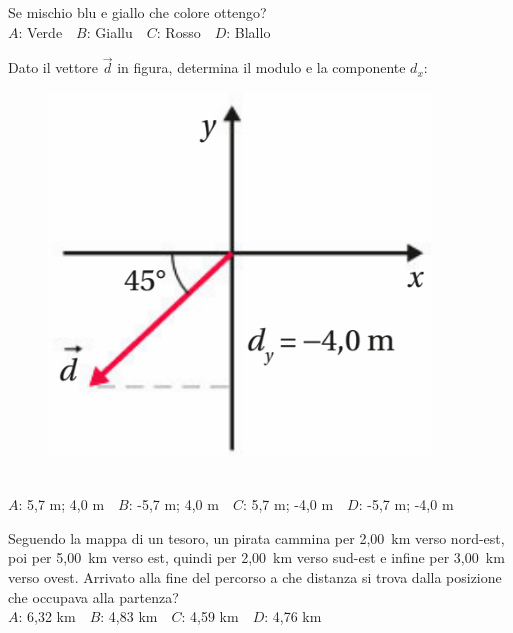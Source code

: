 \def\mcquestionnumber{5}


\mcquestionheader Se mischio blu e giallo che colore ottengo?\\
{$A$}: Verde\ \ {$B$}: Giallu\ \ {$C$}: Rosso\ \ {$D$}: Blallo\ \ 

\mcquestionfooter



\def\mcquestionnumber{6}


\mcquestionheader Dato il vettore $\vec{d}$ in figura, determina il modulo e la componente $d_x$: \begin{figure}[h!]   \begin{center}     \includegraphics[scale=0.35]{vettored.png}   \end{center} \end{figure}\\
{$A$}: 5,7 m; 4,0 m\ \ {$B$}: -5,7 m; 4,0 m\ \ {$C$}: 5,7 m; -4,0 m\ \ {$D$}: -5,7 m; -4,0 m\ \ 

\mcquestionfooter



\def\mcquestionnumber{7}


\mcquestionheader Seguendo la mappa di un tesoro, un pirata cammina per 2,00~km verso nord-est, poi per 5,00~km verso est, quindi per 2,00~km verso sud-est e infine per 3,00~km verso ovest. Arrivato alla fine del percorso a che distanza si trova dalla posizione che occupava alla partenza?\\
{$A$}: 6,32 km\ \ {$B$}: 4,83 km\ \ {$C$}: 4,59 km\ \ {$D$}: 4,76 km\ \ 

\mcquestionfooter



